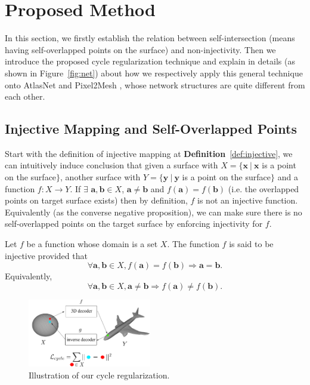 \section{Proposed Method}

In this section, we firstly establish the relation between self-intersection (means having self-overlapped points on the surface) and non-injectivity.  
Then we introduce the proposed cycle regularization technique and explain in details (as shown in Figure~\ref{fig:net}) about how we respectively apply this general technique onto AtlasNet \cite{atlasnet} and Pixel2Mesh \cite{pixel2mesh}, whose network structures are quite different from each other.

\subsection{Injective Mapping and Self-Overlapped Points}
Start with the definition of injective mapping at \textbf{Definition}~\ref{def:injective}, we can intuitively induce conclusion that given a surface with $X =\{\mathbf{x}~|~\mathbf{x}$ is a point on the surface$\} $, another surface with $ Y =\{\mathbf{y}~|~\mathbf{y}$ is a point on the surface$\}$ and a function $f:X \rightarrow Y$. If $\exists$ $ \mathbf{a},\mathbf{b} \in X$, $\mathbf{a} \neq \mathbf{b}$ and $f(\mathbf{a}) = f(\mathbf{b})$ (i.e. the overlapped points on target surface exists) then by definition, $f$ is not an injective function. Equivalently (as the converse negative proposition), we can make sure there is no self-overlapped points on the target surface by enforcing injectivity for $f$.
\begin{m_def}
\label{def:injective}
Let $f$ be a function whose domain is a set $X$. The function $f$ is said to be injective provided that
\begin{equation}
\forall \mathbf{a},\mathbf{b} \in X, f(\mathbf{a}) = f(\mathbf{b}) \Rightarrow \mathbf{a} = \mathbf{b}.
\end{equation}
Equivalently, 
\begin{equation}
\forall \mathbf{a},\mathbf{b} \in X, \mathbf{a} \neq \mathbf{b} \Rightarrow f(\mathbf{a}) \neq f(\mathbf{b}).
\end{equation}
\end{m_def}
\begin{figure}
	\vspace{-20pt}
	\begin{center}
		\includegraphics[width=0.48\textwidth]{img/net/cycle}
	\end{center}
	\caption{Illustration of our cycle regularization.}
	\label{fig:cycle}
\end{figure}
